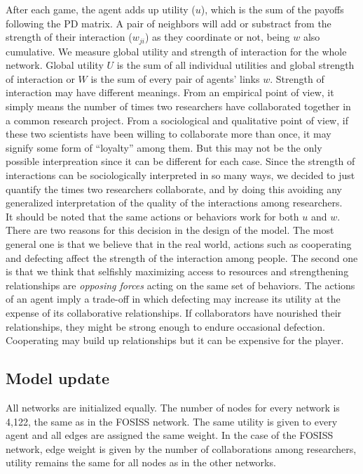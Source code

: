 \documentclass{bmcart}
\begin{document}
After each game, the agent adds up utility ($u$), which is the sum of the
payoffs following the PD matrix. A pair of neighbors will add or substract from
the strength of their interaction ($w_{ji}$) as they coordinate or not, being
$w$ also cumulative. We measure global utility and strength of interaction for
the whole network. Global utility $U$ is the sum of all individual utilities and
global strength of interaction or $W$ is the sum of every pair of agents' links
$w$. {\color{red}Strength of interaction may have different meanings. From an empirical
point of view, it simply means the number of times two researchers have
collaborated together in a common research project. From a sociological and
qualitative point of view, if these two scientists have been willing to
collaborate more than once, it may signify some form of ``loyalty'' among them. But
this may not be the only possible interpreation since it can be different for
each case. Since the strength of interactions can be sociologically interpreted
in so many ways, we decided to just quantify the  times two researchers
collaborate, and by doing this avoiding any generalized interpretation of the
quality of the interactions among researchers.} \\ 


It should be noted that the same actions or behaviors work for both
$u$ and $w$. There are two reasons for this decision in the design of
the model. The most general one is that we believe that in the real
world, actions such as cooperating and defecting affect the strength
of the interaction among people. The second one is that we think that
selfishly maximizing access to resources and strengthening
relationships are \emph{opposing forces} acting on the same set of
behaviors. The actions of an agent imply a trade-off in which
defecting may increase its utility at the expense of its collaborative
relationships. If collaborators have nourished their relationships,
they might be strong enough to endure occasional
defection. Cooperating may build up relationships but it can be
expensive for the player.

\subsection*{Model update}

All networks are initialized equally. The number of nodes for every
network is 4,122, the same as in the FOSISS network.  The same utility
is given to every agent and all edges are assigned the same weight. In
the case of the FOSISS network, edge weight is given by the number of
collaborations among researchers, utility remains the same for all
nodes as in the other networks.\\
\end{document}
